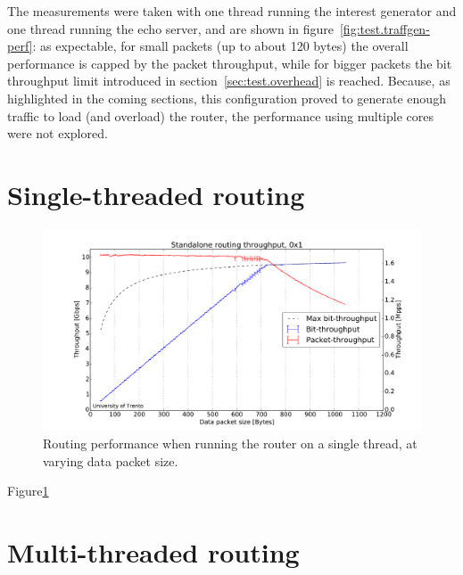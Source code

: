 \documentclass[11pt,a4paper,twoside,titlepage,openany]{book}
\begin{document}
The measurements were taken with one thread running the interest generator and one thread running the echo server, and are shown in figure~\ref{fig:test.traffgen-perf}: as expectable, for small packets (up to about 120 bytes) the overall performance is capped by the packet throughput, while for bigger packets the bit throughput limit introduced in section~\ref{sec:test.overhead} is reached.
Because, as highlighted in the coming sections, this configuration proved to generate enough traffic to load (and overload) the router, the performance using multiple cores were not explored.

\section{Single-threaded routing}
\begin{figure}[htb]
  \begin{center}
    \includegraphics[width=1.0\textwidth]{img/augustus_increasing_len_0x1.pdf}
    \caption[Single-threaded routing performance at varying data packet size]{Routing performance when running the router on a single thread, at varying data packet size.}
    \label{fig:test.incr_len_single}
  \end{center}
\end{figure}

Figure\ref{fig:test.incr_len_single}
\todo[inline]{}

\section{Multi-threaded routing}\label{sec:test.multicore}
\end{document}
